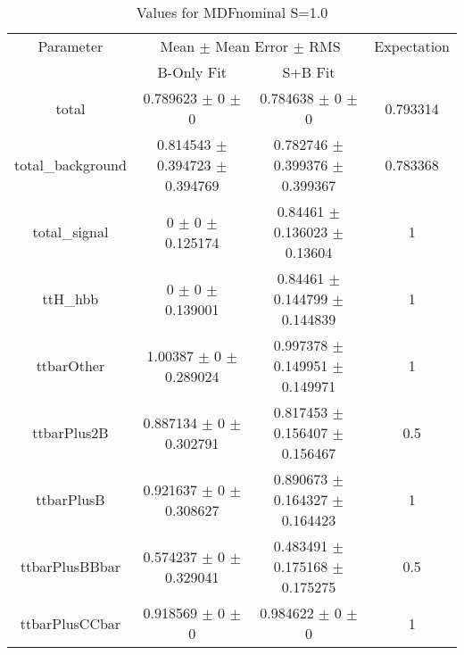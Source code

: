 \begin{table}
\centering
\caption{Values for MDFnominal S=1.0}
\begin{tabular}{cccc}
\toprule
Parameter & \multicolumn{2}{c}{Mean $\pm$ Mean Error $\pm$ RMS} & Expectation\\
 & B-Only Fit & S+B Fit & \\
\midrule
total & \num{0.789623} $\pm$ \num{0} $\pm$ \num{0} & \num{0.784638} $\pm$ \num{0} $\pm$ \num{0} & \num{0.793314}\\
total\_background & \num{0.814543} $\pm$ \num{0.394723} $\pm$ \num{0.394769} & \num{0.782746} $\pm$ \num{0.399376} $\pm$ \num{0.399367} & \num{0.783368}\\
total\_signal & \num{0} $\pm$ \num{0} $\pm$ \num{0.125174} & \num{0.84461} $\pm$ \num{0.136023} $\pm$ \num{0.13604} & \num{1}\\
ttH\_hbb & \num{0} $\pm$ \num{0} $\pm$ \num{0.139001} & \num{0.84461} $\pm$ \num{0.144799} $\pm$ \num{0.144839} & \num{1}\\
ttbarOther & \num{1.00387} $\pm$ \num{0} $\pm$ \num{0.289024} & \num{0.997378} $\pm$ \num{0.149951} $\pm$ \num{0.149971} & \num{1}\\
ttbarPlus2B & \num{0.887134} $\pm$ \num{0} $\pm$ \num{0.302791} & \num{0.817453} $\pm$ \num{0.156407} $\pm$ \num{0.156467} & \num{0.5}\\
ttbarPlusB & \num{0.921637} $\pm$ \num{0} $\pm$ \num{0.308627} & \num{0.890673} $\pm$ \num{0.164327} $\pm$ \num{0.164423} & \num{1}\\
ttbarPlusBBbar & \num{0.574237} $\pm$ \num{0} $\pm$ \num{0.329041} & \num{0.483491} $\pm$ \num{0.175168} $\pm$ \num{0.175275} & \num{0.5}\\
ttbarPlusCCbar & \num{0.918569} $\pm$ \num{0} $\pm$ \num{0} & \num{0.984622} $\pm$ \num{0} $\pm$ \num{0} & \num{1}\\
\bottomrule
\end{tabular}
\end{table}
